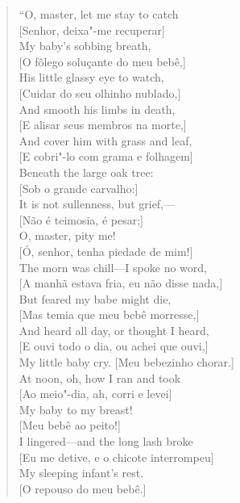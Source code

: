 \begin{verse}
``O, master, let me stay to catch\\
{[}Senhor, deixa"-me recuperar{]}\\
My baby's sobbing breath,\\
{[}O fôlego soluçante do meu bebê,{]}\\
His little glassy eye to watch,\\
{[}Cuidar do seu olhinho nublado,{]}\\
And smooth his limbs in death,\\
{[}E alisar seus membros na morte,{]}\\[5pt]

And cover him with grass and leaf,\\
{[}E cobri"-lo com grama e folhagem{]}\\
Beneath the large oak tree:\\
{[}Sob o grande carvalho:{]}\\
It is not sullenness, but grief,---\\
{[}Não é teimosia, é pesar;{]}\\
O, master, pity me!\\
{[}Ó, senhor, tenha piedade de mim!{]}\\[5pt]

The morn was chill---I spoke no word,\\
{[}A manhã estava fria, eu não disse nada,{]}\\
But feared my babe might die,\\
{[}Mas temia que meu bebê morresse,{]}\\
And heard all day, or thought I heard,\\
{[}E ouvi todo o dia, ou achei que ouvi,{]}\\
My little baby cry. {[}Meu bebezinho chorar.{]}\\[5pt]

At noon, oh, how I ran and took\\
{[}Ao meio"-dia, ah, corri e levei{]}\\
My baby to my breast!\\
{[}Meu bebê ao peito!{]}\\
I lingered---and the long lash broke\\
{[}Eu me detive, e o chicote interrompeu{]}\\
My sleeping infant's rest.\\
{[}O repouso do meu bebê.{]}\\[5pt]


\end{verse}
